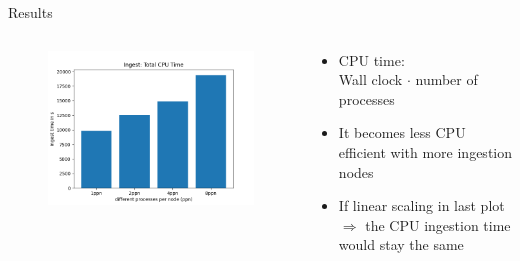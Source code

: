 \documentclass[compress,aspectratio=169]{beamer}
\begin{document}
  \begin{frame}{Results}
    \begin{columns}
      \begin{column}{0.5\textwidth}
        \begin{figure}
          \includegraphics[height=0.9\textwidth]{./analysis/cputime.png}
        \end{figure}
      \end{column}
      \begin{column}{0.5\textwidth}
        \begin{itemize}
          \item CPU time:\\ Wall clock $\cdot$ number of processes
          \item It becomes less CPU efficient with more ingestion nodes
          \item If linear scaling in last plot $\Rightarrow$ the CPU ingestion time would stay the same
        \end{itemize}
      \end{column}
    \end{columns}
  \end{frame}
\end{document}
